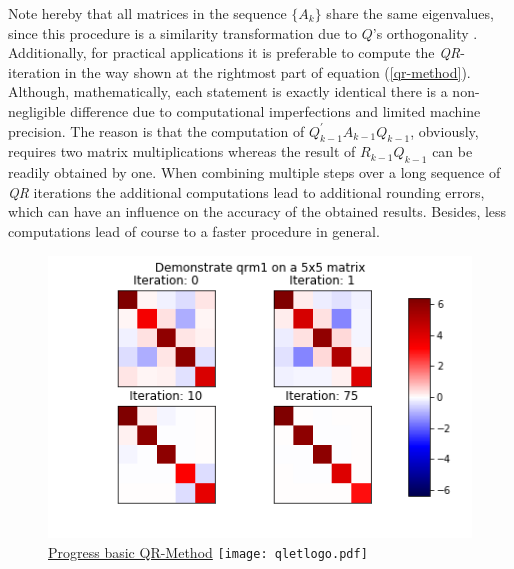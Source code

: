 \documentclass[12pt]{article}
\begin{document}
Note hereby that all matrices in the sequence $\{A_k\}$ share the same eigenvalues, since this procedure is a similarity transformation due to $Q$'s orthogonality \citep[p. 121]{NME}. Additionally, for practical applications it is preferable to compute the \textit{QR}-iteration in the way shown at the rightmost part of equation (\ref{qr-method}). Although, mathematically, each statement is exactly identical there is a non-negligible difference due to computational imperfections and limited machine precision. The reason is that the computation of $Q_{k-1}^{\prime} A_{k-1} Q_{k-1}$, obviously, requires two matrix multiplications whereas the result of $R_{k-1}Q_{k-1}$ can be readily obtained by one. When combining multiple steps over a long sequence of \textit{QR} iterations the additional computations lead to additional rounding errors, which can have an influence on the accuracy of the obtained results. Besides, less computations lead of course to a faster procedure in general.

\begin{figure}
\begin{center}
\label{qrm1-plot}
\caption{\href {https://github.com/thsis/NIS18/tree/master/media/plots}{Progress basic QR-Method}  \protect\texttt{[image: qletlogo.pdf]}}
  \includegraphics[scale=0.6]{../media/plots/qrm1.png}
\end{center}
\end{figure}
\end{document}
